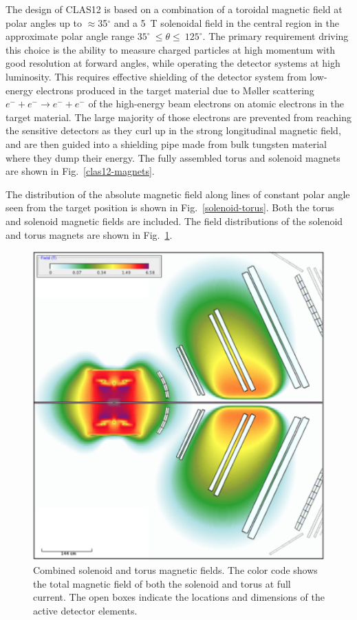 \documentclass[final,3p,twocolumn]{elsarticle}
\begin{document}
The design of CLAS12 is based on a combination of a toroidal magnetic field at polar angles up to $\approx$35$^\circ$
and a 5~T solenoidal field in the central region in the approximate polar angle range $35^\circ~\le \theta \le~125^\circ$.
The primary requirement driving this choice is the ability to measure charged particles at high momentum with good
resolution at forward angles, while operating the detector systems at high luminosity. This requires effective
shielding of the detector system from low-energy electrons produced in the target material due to M{\o}ller
scattering $e^- + e^- \to e^- + e^-$ of the high-energy beam electrons on atomic electrons in the target material.
The large majority of those electrons are prevented from reaching the sensitive detectors as they curl up in the
strong longitudinal magnetic field, and are then guided into a shielding pipe made from bulk tungsten material where
they dump their energy. The fully assembled torus and solenoid magnets are shown in Fig.~\ref{clas12-magnets}.

The distribution of the absolute magnetic field along lines of constant polar angle seen from the target position is
shown in Fig.~\ref{solenoid-torus}. Both the torus and solenoid magnetic fields are included. The field distributions 
of the solenoid and torus magnets are shown in Fig.~\ref{stray-field}.  

\begin{figure}[th!]
\centerline{\includegraphics[width=0.9\columnwidth]{magfield-2.png}}
\caption{Combined solenoid and torus magnetic fields. The color code shows the total magnetic field of both the
  solenoid and torus at full current. The open boxes indicate the locations and dimensions of the active detector
  elements.}
\label{stray-field}
\end{figure}
\end{document}
